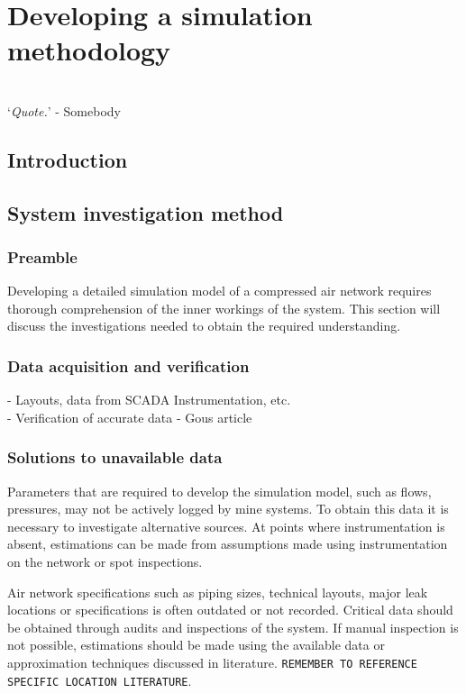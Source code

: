 \chapter{Developing a simulation methodology}
\thispagestyle{empty}
\vspace{38em}
\hrulefill
\\
\enquote*{\textit{Quote.}} - Somebody\\
\newpage
\section{Introduction}
\section{System investigation method}
	\subsection{Preamble}
		Developing a detailed simulation model of a compressed air network requires thorough comprehension of the inner workings of the system. This section will discuss the investigations needed to obtain the required understanding.
	\subsection{Data acquisition and verification} %
		- Layouts, data from SCADA Instrumentation, etc.\\
		- Verification of accurate data - Gous article
	\subsection{Solutions to unavailable data}
		Parameters that are required to develop the simulation model, such as flows, pressures, may not be actively logged by mine systems. To obtain this data it is necessary to investigate alternative sources. At points where instrumentation is absent, estimations can be made from assumptions made using instrumentation on the network or spot inspections.
		\par 
		Air network specifications such as piping sizes, technical layouts, major leak locations or specifications is often outdated or not recorded. Critical data should be obtained through audits and inspections of the system. If manual inspection is not possible, estimations should be made using the available data or approximation techniques discussed in literature. \texttt{REMEMBER TO REFERENCE\\ SPECIFIC LOCATION LITERATURE}.
